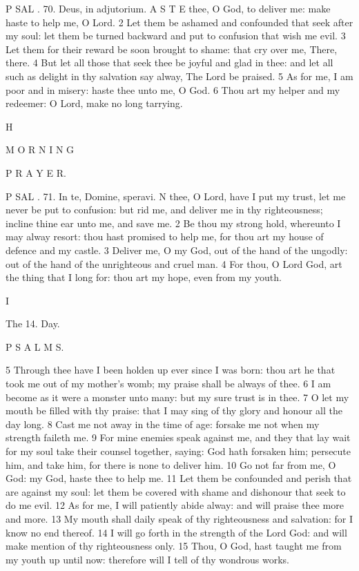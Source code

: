 P SAL . 70. Deus, in adjutorium. A S T E thee, O God, to deliver me: make haste to help me, O Lord. 2 Let them be ashamed and confounded that seek after my soul: let them be turned backward and put to confusion that wish me evil. 3 Let them for their reward be soon brought to shame: that cry over me, There, there. 4 But let all those that seek thee be joyful and glad in thee: and let all such as delight in thy salvation say alway, The Lord be praised. 5 As for me, I am poor and in misery: haste thee unto me, O God. 6 Thou art my helper and my redeemer: O Lord, make no long tarrying.

H

M O R N I N G

P R A Y E R.

P SAL . 71. In te, Domine, speravi. N thee, O Lord, have I put my trust, let me never be put to confusion: but rid me, and deliver me in thy righteousness; incline thine ear unto me, and save me. 2 Be thou my strong hold, whereunto I may alway resort: thou hast promised to help me, for thou art my house of defence and my castle. 3 Deliver me, O my God, out of the hand of the ungodly: out of the hand of the unrighteous and cruel man. 4 For thou, O Lord God, art the thing that I long for: thou art my hope, even from my youth.

I

The 14. Day.

P S A L M S.

5 Through thee have I been holden up ever since I was born: thou art he that took me out of my mother’s womb; my praise shall be always of thee. 6 I am become as it were a monster unto many: but my sure trust is in thee. 7 O let my mouth be filled with thy praise: that I may sing of thy glory and honour all the day long. 8 Cast me not away in the time of age: forsake me not when my strength faileth me. 9 For mine enemies speak against me, and they that lay wait for my soul take their counsel together, saying: God hath forsaken him; persecute him, and take him, for there is none to deliver him. 10 Go not far from me, O God: my God, haste thee to help me. 11 Let them be confounded and perish that are against my soul: let them be covered with shame and dishonour that seek to do me evil. 12 As for me, I will patiently abide alway: and will praise thee more and more. 13 My mouth shall daily speak of thy righteousness and salvation: for I know no end thereof. 14 I will go forth in the strength of the Lord God: and will make mention of thy righteousness only. 15 Thou, O God, hast taught me from my youth up until now: therefore will I tell of thy wondrous works.

